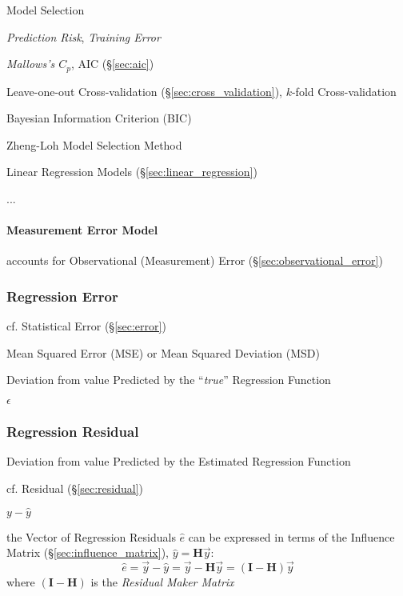 Model Selection

\emph{Prediction Risk}, \emph{Training Error}

\emph{Mallows's $C_p$}, AIC (\S\ref{sec:aic})

Leave-one-out Cross-validation (\S\ref{sec:cross_validation}),
$k$-fold Cross-validation

Bayesian Information Criterion (BIC) %

Zheng-Loh Model Selection Method

Linear Regression Models (\S\ref{sec:linear_regression})

...



\paragraph{Measurement Error Model}\label{sec:measurement_error_model}\hfill

accounts for Observational (Measurement) Error (\S\ref{sec:observational_error})



\subsubsection{Regression Error}\label{sec:regression_error}

\fist cf. Statistical Error (\S\ref{sec:error})

Mean Squared Error (MSE) or Mean Squared Deviation (MSD)

Deviation from value Predicted by the ``\emph{true}'' Regression Function

$\epsilon$



\subsubsection{Regression Residual}\label{sec:regression_residual}

Deviation from value Predicted by the Estimated Regression Function

\fist cf. Residual (\S\ref{sec:residual})

$y - \hat{y}$

the Vector of Regression Residuals $\hat{e}$ can be expressed in terms of the
Influence Matrix (\S\ref{sec:influence_matrix}), $\hat{y} = \mathbf{H}\vec{y}$:
\[
  \hat{e} = \vec{y} - \hat{y} = \vec{y} - \mathbf{H}\vec{y} =
    (\mathbf{I} - \mathbf{H})\vec{y}
\]
where $(\mathbf{I} - \mathbf{H})$ is the \emph{Residual Maker Matrix}

